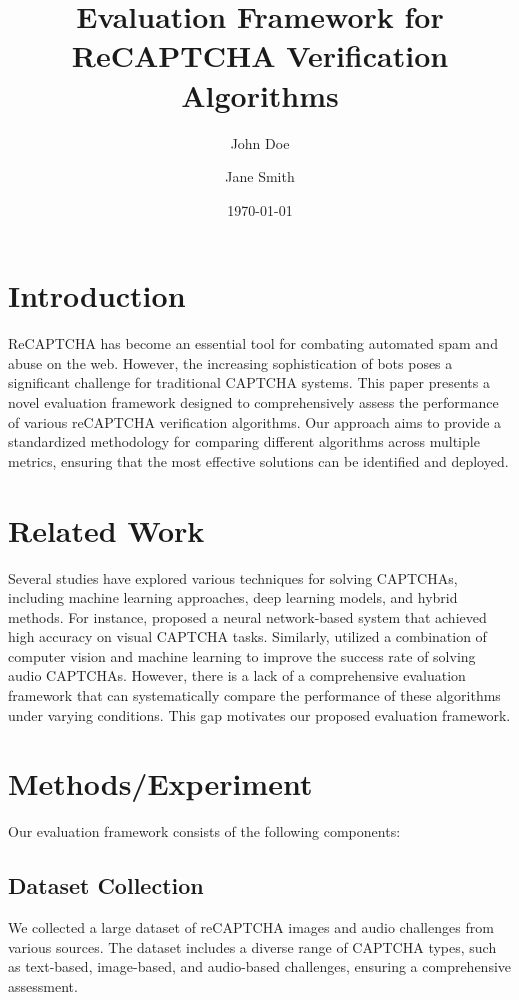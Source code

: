 \documentclass{article}
\title{Evaluation Framework for ReCAPTCHA Verification Algorithms}
\author{John Doe \and Jane Smith}
\date{\today}
\begin{document}
\maketitle

\section{Introduction}
ReCAPTCHA has become an essential tool for combating automated spam and abuse on the web. However, the increasing sophistication of bots poses a significant challenge for traditional CAPTCHA systems. This paper presents a novel evaluation framework designed to comprehensively assess the performance of various reCAPTCHA verification algorithms. Our approach aims to provide a standardized methodology for comparing different algorithms across multiple metrics, ensuring that the most effective solutions can be identified and deployed.

\section{Related Work}
Several studies have explored various techniques for solving CAPTCHAs, including machine learning approaches, deep learning models, and hybrid methods. For instance, \cite{ref1} proposed a neural network-based system that achieved high accuracy on visual CAPTCHA tasks. Similarly, \cite{ref2} utilized a combination of computer vision and machine learning to improve the success rate of solving audio CAPTCHAs. However, there is a lack of a comprehensive evaluation framework that can systematically compare the performance of these algorithms under varying conditions. This gap motivates our proposed evaluation framework.

\section{Methods/Experiment}
Our evaluation framework consists of the following components:

\subsection{Dataset Collection}
We collected a large dataset of reCAPTCHA images and audio challenges from various sources. The dataset includes a diverse range of CAPTCHA types, such as text-based, image-based, and audio-based challenges, ensuring a comprehensive assessment.
\end{document}
